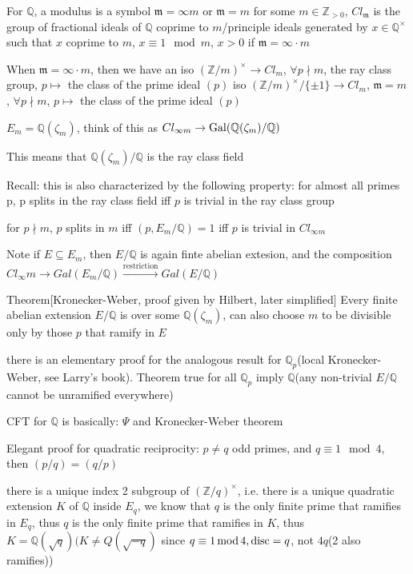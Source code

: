 \documentclass[main]{subfiles}
\begin{document}
\begin{theorem}
For $\mathbb Q$, a modulus is a symbol $\mathfrak m=\infty m$ or $\mathfrak m=m$ for some $m\in \mathbb Z_{>0}$, $Cl_{\mathfrak m}$ is the group of fractional ideals of $\mathbb Q$ coprime to $m$/principle ideals generated by $x\in \mathbb Q^\times$ such that $x$ coprime to $m$, $x\equiv1\mod m$, $x>0$ if $\mathfrak m=\infty\cdot m$
\end{theorem}

\begin{exercise}
When $\mathfrak m=\infty\cdot m$, then we have an iso $(\mathbb Z/m)^\times\to Cl_m$, $\forall p\nmid m$, the ray class group, $p\mapsto$ the class of the prime ideal $(p)$
iso $(\mathbb Z/m)^\times/\{\pm1\}\to Cl_m$, $\mathfrak m=m$, $\forall p\nmid m$, $p\mapsto$ the class of the prime ideal $(p)$
\end{exercise}

$E_m=\mathbb Q(\zeta_m)$, think of this as $Cl_{\infty m}\to\operatorname{Gal}(\mathbb Q(\zeta_m)/\mathbb Q)$

This means that $\mathbb Q(\zeta_m)/\mathbb Q$ is the ray class field

Recall: this is also characterized by the following property: for almost all primes p, p splits in the ray class field iff $p$ is trivial in the ray class group

for $p\nmid m$, $p$ splits in $m$ iff $(p,E_m/\mathbb Q)=1$ iff $p$ is trivial in $Cl_{\infty m}$

Note if $E\subseteq E_m$, then $E/\mathbb Q$ is again finte abelian extesion, and the composition $Cl_\infty m\to Gal(E_m/\mathbb Q)\xrightarrow{\text{restriction}} Gal(E/\mathbb Q)$

Theorem[Kronecker-Weber, proof given by Hilbert, later simplified]
Every finite abelian extension $E/\mathbb Q$ is over some $\mathbb Q(\zeta_m)$, can also choose $m$ to be divisible only by those $p$ that ramify in $E$

there is an elementary proof for the analogous result for $\mathbb Q_p$(local Kronecker-Weber, see Larry's book). Theorem true for all $\mathbb Q_p$ imply $\mathbb Q$(any non-trivial $E/\mathbb Q$ cannot be unramified everywhere)

CFT for $\mathbb Q$ is basically: $\Psi$ and Kronecker-Weber theorem

Elegant proof for quadratic reciprocity: $p\neq q$ odd primes, and $q\equiv1\mod 4$, then $(p/q)=(q/p)$

there is a unique index 2 subgroup of $(\mathbb Z/q)^\times$, i.e. there is a unique quadratic extension $K$ of $\mathbb Q$ inside $E_q$, we know that $q$ is the only finite prime that ramifies in $E_q$, thus $q$ is the only finite prime that ramifies in $K$, thus $K=\mathbb Q(\sqrt{q})(K\neq Q(\sqrt{-q})$ since $q\equiv1\,\mathrm{mod}\,4, \operatorname{disc}=q$, not $4q$(2 also ramifies))
\end{document}
